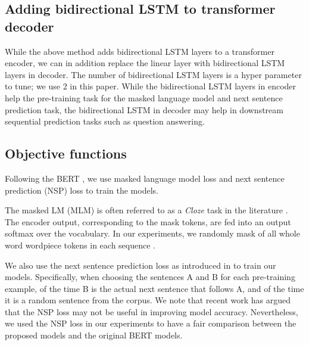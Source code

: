 \documentclass[11pt,a4paper]{article}
\begin{document}
\subsection{Adding bidirectional LSTM to transformer decoder}
While the above method adds bidirectional LSTM layers to a transformer encoder, we can in addition replace the linear layer with bidirectional LSTM layers in decoder.  The number of bidirectional LSTM layers is a hyper parameter to tune; we use 2 in this paper. While the bidirectional LSTM layers in encoder help the pre-training task for the masked language model and next sentence prediction task, the bidirectional LSTM in decoder may help in downstream sequential prediction tasks such as question answering. 

\subsection{Objective functions}
Following the BERT \cite{devlin2018}, we use masked language model loss and next sentence prediction (NSP) loss to train the models.

The masked LM (MLM) is often referred to as a \textit{Cloze} task in the literature \cite{taylor1953}. The encoder output, corresponding to the mask tokens, are fed into an output softmax over the vocabulary. In our experiments, we randomly mask  of all whole word wordpiece tokens in each sequence \cite{wu2016}.

We also use the next sentence prediction loss as introduced in \cite{devlin2018} to train our models.  Specifically,
when choosing the sentences A and B for each pre-training example,  of the time B is the actual next sentence that follows A, and  of the time it is a random sentence from the corpus. We note that recent work \cite{yang2019,liu2019,lan2019,raffel2019} has argued that the NSP loss may not be useful in improving model accuracy. Nevertheless, we used the NSP loss in our experiments to have a fair comparison between the proposed models and the original BERT models.
\end{document}
